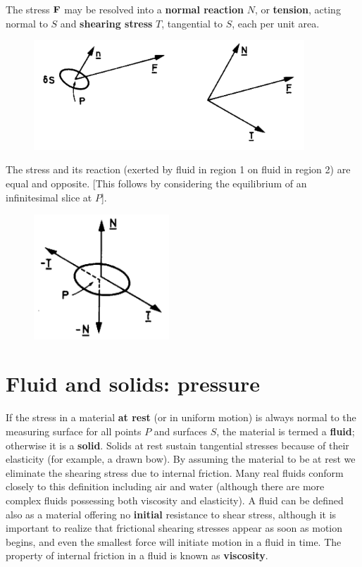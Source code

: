 \documentclass[twoside,a4paper,11pt]{report}
\begin{document}
The stress  ${\bf F}$ may be resolved into a \textbf{normal reaction} $N$, or 
\textbf{tension}, acting normal to $S$ and \textbf{shearing stress} $T$, 
tangential to $S$, each per unit area.

\begin{figure}[htbp]
\centerline{\includegraphics[width=4in]{Section23.pdf}}
\label{fig3}
\end{figure}

The stress and its reaction (exerted by fluid in region 1 on fluid in region 
2) are equal and opposite. [This follows by considering the equilibrium of 
an infinitesimal slice at $P$].

\begin{figure}[htbp]
\centerline{\includegraphics[width=2in]{Section24.pdf}}
\label{fig4}
\end{figure}

\section{Fluid and solids: pressure}
If the stress in a material \textbf{at rest }(or in uniform motion) is 
always normal to the measuring surface for all points $P$ and surfaces $S$, the 
material is termed a \textbf{fluid}; otherwise it is a \textbf{solid}. 
Solids at rest sustain tangential stresses because of their elasticity (for 
example, a drawn bow). By assuming the material to be at rest we eliminate 
the shearing stress due to internal friction. Many real fluids conform 
closely to this definition including air and water (although there are more 
complex fluids possessing both viscosity and elasticity). A fluid can be 
defined also as a material offering no \textbf{initial} resistance to shear 
stress, although it is important to realize that frictional shearing 
stresses appear as soon as motion begins, and even the smallest force will 
initiate motion in a fluid in time. The property of internal friction in a 
fluid is known as \textbf{viscosity}.
\end{document}
